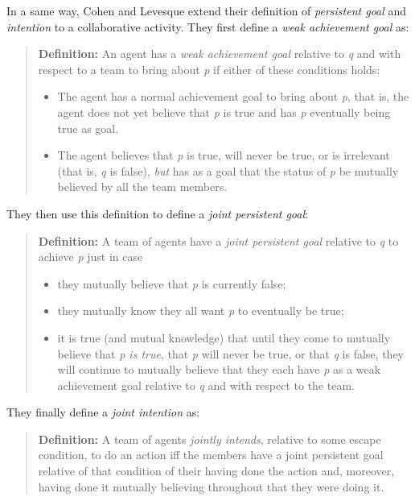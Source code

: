 \documentclass[english,a4paper,11pt,twoside]{StyleThese}
\begin{document}
In a same way, Cohen and Levesque extend their definition of \textit{persistent goal} and \textit{intention} to a collaborative activity. They first define a \textit{weak achievement goal} as:
\begin{quote}
\textbf{Definition: } An agent has a \textit{weak achievement goal} relative to \textit{q} and with respect to a team to bring about \textit{p} if either of these conditions holds:
\begin{itemize}
\item The agent has a normal achievement goal to bring about \textit{p}, that is, the agent does not yet believe that \textit{p} is true and has \textit{p} eventually being true as goal.
\item The agent believes that \textit{p} is true, will never be true, or is irrelevant (that is, \textit{q} is false), \textit{but} has as a goal that the status of \textit{p} be mutually believed by all the team members.
\end{itemize}
\end{quote}

They then use this definition to define a \textit{joint persistent goal}:
\begin{quote}
\textbf{Definition: } A team of agents have a \textit{joint persistent goal} relative to \textit{q} to achieve \textit{p} just in case
\begin{itemize}
\item they mutually believe that \textit{p} is currently false;
\item they mutually know they all want \textit{p} to eventually be true;
\item it is true (and mutual knowledge) that until they come to mutually believe that \textit{p is true}, that \textit{p} will never be true, or that \textit{q} is false, they will continue to mutually believe that they each have \textit{p} as a weak achievement goal relative to \textit{q} and with respect to the team.
\end{itemize}
\end{quote}

They finally define a \textit{joint intention} as:
\begin{quote}
\textbf{Definition:} A team of agents \textit{jointly intends}, relative to some escape condition, to do an action iff the members have a joint persistent goal relative of that condition of their having done the action and, moreover, having done it mutually believing throughout that they were doing it.
\end{quote}
\end{document}
